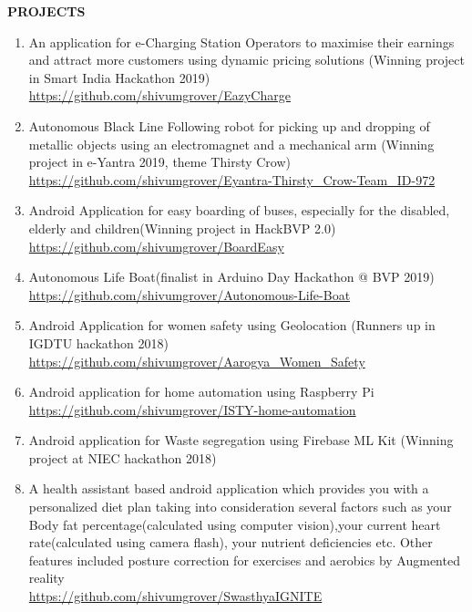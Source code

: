 \documentclass[10pt]{article}
\begin{document}
\begin{minipage}{0.95\textwidth}
\vspace{5mm}
\begin{huge}
\textbf{\color{theme}PROJECTS}
\end{huge}
\begin{mdframed}[backgroundcolor=theme]
\end{mdframed}

\vspace{1mm}

\color{black}\normalsize{{
\begin{enumerate}
\item\color{black} An application for e-Charging Station Operators to maximise their earnings and attract more customers using dynamic pricing solutions (Winning project in Smart India Hackathon 2019)\\
	\color{capri}\url{https://github.com/shivumgrover/EazyCharge}
\color{black} \item  Autonomous Black Line Following robot for picking up and dropping of metallic objects using an electromagnet and a mechanical arm (Winning project in e-Yantra 2019, theme Thirsty Crow)\\
 	\color{capri}\url{ https://github.com/shivumgrover/Eyantra-Thirsty_Crow-Team_ID-972}

\color{black} \item  Android Application for easy boarding of buses, especially for the disabled, elderly and children(Winning project in HackBVP 2.0)\\
	\color{capri}\url{https://github.com/shivumgrover/BoardEasy}
	
 \color{black} \item  Autonomous Life Boat(finalist in Arduino Day Hackathon @ BVP 2019)\\
	\color{capri}\url{https://github.com/shivumgrover/Autonomous-Life-Boat}
 \color{black} \item  Android Application for women safety using Geolocation (Runners up in IGDTU hackathon 2018)
	\color{capri}\url{https://github.com/shivumgrover/Aarogya_Women_Safety}
	
\color{black} \item  Android application for home automation using Raspberry Pi\\
	\color{capri}\url{https://github.com/shivumgrover/ISTY-home-automation}

\color{black} \item  Android application for Waste segregation using Firebase ML Kit (Winning project at NIEC hackathon 2018)
\color{black} \item  A health assistant based android application which provides you with a personalized diet plan taking into consideration several factors such as your Body fat percentage(calculated using computer vision),your current heart rate(calculated using camera flash), your nutrient deficiencies etc. Other features included posture correction for exercises and aerobics by Augmented reality\\
	\color{capri}\url{https://github.com/shivumgrover/SwasthyaIGNITE}


\end{enumerate}}}
\end{minipage}
\end{document}
